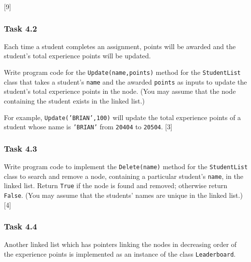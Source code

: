 \hfill{}{[}9{]}

\subsubsection*{Task 4.2 }

Each time a student completes an assignment, points will be awarded
and the student\textquoteright s total experience points will be updated. 

Write program code for the \texttt{Update(name,points)} method for
the \texttt{StudentList} class that takes a student\textquoteright s
\texttt{name} and the awarded \texttt{points} as inputs to update
the student\textquoteright s total experience points in the node.
(You may assume that the node containing the student exists in the
linked list.) 

For example, \texttt{Update('BRIAN',100)} will update the total experience
points of a student whose name is \texttt{'BRIAN'} from \texttt{20404}
to \texttt{20504}. \hfill{}{[}3{]}

\subsubsection*{Task 4.3 }

Write program code to implement the \texttt{Delete(name)} method for
the \texttt{StudentList} class to search and remove a node, containing
a particular student\textquoteright s \texttt{name}, in the linked
list. Return \texttt{True} if the node is found and removed; otherwise
return \texttt{False}. (You may assume that the students\textquoteright{}
names are unique in the linked list.) \hfill{}{[}4{]}

\subsubsection*{Task 4.4 }

Another linked list which has pointers linking the nodes in decreasing
order of the experience points is implemented as an instance of the
class \texttt{Leaderboard}. 

